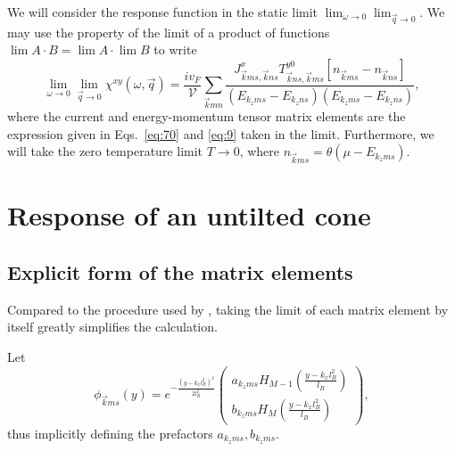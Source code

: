 We will consider the response function in the static limit \( \lim_{\omega \to 0} \lim_{\vec{q} \to 0} \).
We may use the property of the limit of a product of functions \( \lim A\cdot B = \lim A \cdot \lim B \) to write
\begin{equation}
  \lim_{\omega \to 0} \lim_{\vec{q} \to 0} \chi^{xy}(\omega, \vec{q}) = \frac{i v_F }{\mathcal{V}} \sum\limits_{\vec{k} m n}^{}
  \frac{
    J^x_{\vec{k} m s, \vec{k} n s} T^{y 0}_{\vec{k} n s, \vec{k} m s} [n_{\vec{k} m s} - n_{\vec{k} n s}]
  }{
    (E_{k_z m s} - E_{k_z n s}) (E_{k_z m s}- E_{k_z n s})
  },
\end{equation}
where the current and energy-momentum tensor matrix elements are the expression given in Eqs.~\eqref{eq:70} and \eqref{eq:9} taken in the limit.
Furthermore, we will take the zero temperature limit \( T\to 0 \), where \( n_{\vec{k} m s} = \theta(\mu - E_{k_z m s}) \).


\section{Response of an untilted cone}
\subsection{Explicit form of the matrix elements}\label{sec:notilt:explicit}
Compared to the procedure used by \citeauthor{arjonaFingerprintsConformalAnomaly2019}\cite{arjonaFingerprintsConformalAnomaly2019}, taking the limit of each matrix element by itself greatly simplifies the calculation.

Let
\begin{equation}
  \label{eq:72}
  \phi _{\vec{k}ms}(y)
  = e^{-\frac{(y-k_xl_B^2)^2}{2 l_{B}^2}}
  \begin{pmatrix}
    a_{k_zms} H_{M-1} \left( \frac{y - k_xl_B^2}{l_B} \right)\\
    b_{k_zms} H_M \left( \frac{y - k_xl_B^2}{l_B} \right)
  \end{pmatrix},
\end{equation}
thus implicitly defining the prefactors $a_{k_z ms}, b_{k_z ms}$.


